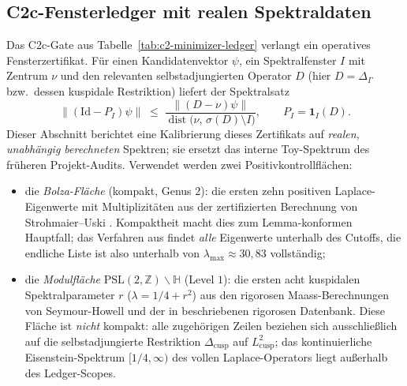 \documentclass[12pt,a4paper]{article}
\theoremstyle{definition}
\theoremstyle{remark}
\newcommand{\HH}{\mathbb{H}}
\newcommand{\ZZ}{\mathbb{Z}}
\newcommand{\Delop}{\Delta_{\Gamma}}
\begin{document}
\subsection{C2c-Fensterledger mit realen Spektraldaten}
\label{sec:c2c-real-ledger}

Das C2c-Gate aus Tabelle~\ref{tab:c2-minimizer-ledger} verlangt ein
operatives Fensterzertifikat. Für einen Kandidatenvektor $\psi$, ein
Spektralfenster $I$ mit Zentrum $\nu$ und den relevanten selbstadjungierten
Operator $D$ (hier $D=\Delop$ bzw.\ dessen kuspidale Restriktion) liefert
der Spektralsatz
\begin{equation}
\label{eq:window-certificate}
\|(\mathrm{Id}-P_I)\psi\| \;\le\;
\frac{\|(D-\nu)\psi\|}{\operatorname{dist}\bigl(\nu,\,\sigma(D)\setminus I\bigr)},
\qquad P_I = \mathbf{1}_I(D).
\end{equation}
Dieser Abschnitt berichtet eine Kalibrierung dieses Zertifikats auf
\emph{realen, unabhängig berechneten} Spektren; sie ersetzt das interne
Toy-Spektrum des früheren Projekt-Audits. Verwendet werden zwei
Positivkontrollflächen:
\begin{itemize}
\item die \emph{Bolza-Fläche} (kompakt, Genus $2$): die ersten zehn
positiven Laplace-Eigenwerte mit Multiplizitäten aus der zertifizierten
Berechnung von Strohmaier--Uski \cite{StrohmaierUski2013}. Kompaktheit macht
dies zum Lemma-konformen Hauptfall; das Verfahren aus
\cite{StrohmaierUski2013} findet \emph{alle} Eigenwerte unterhalb des
Cutoffs, die endliche Liste ist also unterhalb von
$\lambda_{\max}\approx 30{,}83$ vollständig;
\item die \emph{Modulfläche} $\mathrm{PSL}(2,\ZZ)\backslash\HH$
(Level $1$): die ersten acht kuspidalen Spektralparameter $r$
($\lambda = 1/4 + r^2$) aus den rigorosen Maass-Berechnungen von
Seymour-Howell \cite{SeymourHowell2022} und der in \cite{LowryDuda2025}
beschriebenen rigorosen Datenbank. Diese Fläche ist \emph{nicht} kompakt:
alle zugehörigen Zeilen beziehen sich ausschließlich auf die
selbstadjungierte Restriktion $\Delta_{\mathrm{cusp}}$ auf
$L^2_{\mathrm{cusp}}$; das kontinuierliche Eisenstein-Spektrum
$[1/4,\infty)$ des vollen Laplace-Operators liegt außerhalb des
Ledger-Scopes.
\end{itemize}
\end{document}
